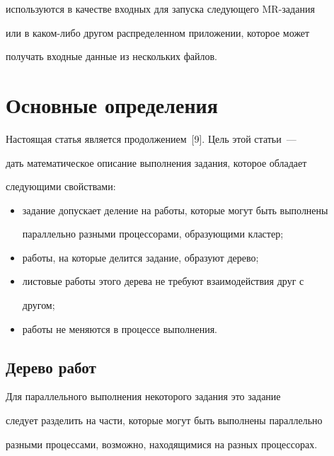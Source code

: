 используются в качестве входных для запуска следующего MR-за\-да\-ния 


или в ка\-ком-ли\-бо другом распределенном приложении, которое может 


получать входные данные из нескольких файлов. 





\section{Основные определения}





      Настоящая статья является продолжением~[9]. Цель этой статьи~--- 


дать математическое описание выполнения задания, которое обладает 


следующими свойствами:


      \begin{itemize}


\item задание допускает деление на работы, которые могут быть выполнены 


параллельно разными процессорами, образующими кластер;


\item работы, на которые делится задание, образуют дерево;


\item листовые работы этого дерева не требуют взаимодействия друг с 


другом;


\item работы не меняются в процессе выполнения.


\end{itemize}





\subsection{Дерево работ}


      


      Для параллельного выполнения некоторого задания это задание 


следует разделить на части, которые могут быть выполнены параллельно 


разными процессами, возможно, находящимися на разных процессорах. 


